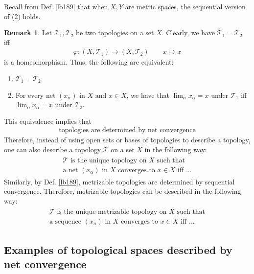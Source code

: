 \documentclass[12pt,b5paper,notitlepage]{article}
\theoremstyle{definition}
\newtheorem{rem}[df]{Remark}
\theoremstyle{plain}
\newcommand{\mc}{\mathcal}
\numberwithin{equation}{section}
\begin{document}
Recall from Def. \ref{lb189} that when $X,Y$ are metric spaces, the sequential version of (2) holds. 

\begin{rem}
Let $\mc T_1,\mc T_2$ be two topologies on a set $X$. Clearly, we have $\mc T_1=\mc T_2$ iff
\begin{gather}
\varphi:(X,\mc T_1)\rightarrow(X,\mc T_2)\qquad x\mapsto x
\end{gather}
is a homeomorphism. Thus, the following are equivalent:
\begin{enumerate}[label=(\arabic*)]
\item $\mc T_1=\mc T_2$.
\item For every net $(x_\alpha)$ in $X$ and $x\in X$, we have that $\lim_\alpha x_\alpha=x$ under $\mc T_1$ iff $\lim_\alpha x_\alpha=x$ under $\mc T_2$.
\end{enumerate}
This equivalence implies that
\begin{align*}
\boxed{\text{ topologies are determined by net convergence }}
\end{align*}
Therefore, instead of using open sets or bases of topologies to describe a topology, one can also describe a topology $\mc T$ on a set $X$ in the following way:
\begin{gather}\label{eq65}
\begin{gathered}
\text{$\mc T$ is the unique topology on $X$ such that}\\
\text{a net $(x_\alpha)$ in $X$ converges to $x\in X$ iff ...}
\end{gathered}
\end{gather}
Similarly, by Def. \ref{lb189}, metrizable topologies are determined by sequential convergence. Therefore, metrizable topologies can be described in the following way:
\begin{gather}
\begin{gathered}
\text{$\mc T$ is the unique metrizable topology on $X$ such that}\\
\text{a sequence $(x_n)$ in $X$ converges to $x\in X$ iff ...}
\end{gathered}
\end{gather}
\end{rem}





\subsection{Examples of topological spaces described by net convergence}
\end{document}
